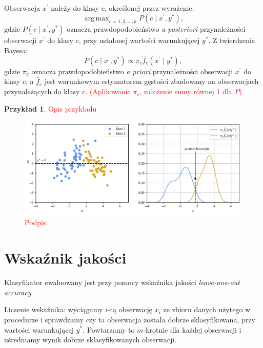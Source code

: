 \documentclass[12pt,a4paper,oneside]{book}
\theoremstyle{definition}
\newtheorem{exmp}{Przykład}[chapter]
\DeclareMathOperator*{\argmax}{arg\,max}
\begin{document}
Obserwacja $x^\prime$ należy do klasy $c$, określonej przez wyrażenie:
\begin{equation} \label{eq:bayes_classifier1}
\argmax_{c=1,2,...,k} P(c \mid x^\prime, y^*),
\end{equation}
gdzie $P(c \mid x^\prime, y^*)$ oznacza prawdopodobieństwo \textit{a posteriori} przynależności obserwacji $x^\prime$ do klasy $c$, przy ustalonej wartości warunkującej $y^*$. Z twierdzenia Bayesa:
\begin{equation} \label{eq:bayes_classifier2}
P(c \mid x^\prime, y^*) \propto \pi_c \hat{f}_c(x^\prime \mid y^*),
\end{equation}
gdzie $\pi_c$ oznacza prawdopodobieństwo \textit{a priori} przynależności obserwacji $x^\prime$ do klasy $c$, a $\hat{f}_c$ jest warunkowym estymatorem gęstości zbudowany na obserwacjach przynależących do klasy $c$. \textcolor{red}{(Aplikowanie $\pi_c$, założenie sumy równej 1 dla $P$)}

\begin{exmp}
\textcolor{red}{Opis przykładu}
\begin{figure}[H]
    \centering
    \includegraphics[scale=0.6]{ckde_classifier_construction}
    \caption{\textcolor{red}{Podpis.}}
    \label{fig:ckde_classifier_construction}
\end{figure}
\end{exmp}

\section{Wskaźnik jakości}
Klasyfikator ewaluowany jest przy pomocy wskaźnika jakości \textit{leave-one-out accuracy}.

Liczenie wskaźnika: wyciągamy $i$-tą obserwację $x_i$ ze zbioru danych użytego w procedurze i sprawdzamy czy ta obserwacja została dobrze sklasyfikowana, przy wartości warunkującej $y^*$. Powtarzamy to $m$-krotnie dla każdej obserwacji i uśredniamy wynik dobrze sklasyfikowanych obserwacji.
\end{document}
